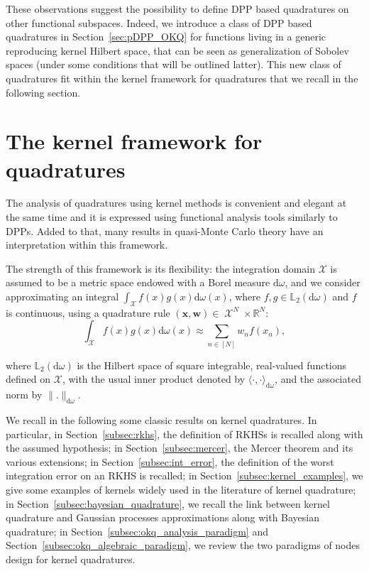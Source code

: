 \documentclass[twoside,11pt]{book}
\numberwithin{theorem}{chapter}
\numberwithin{definition}{chapter}
\numberwithin{proposition}{chapter}
\numberwithin{corollary}{chapter}
\numberwithin{example}{chapter}
\numberwithin{lemma}{chapter}
\DeclareMathOperator{\X}{\mathcal{X}}
\begin{document}
These observations suggest the possibility to define DPP based quadratures on other functional subspaces. Indeed, we introduce a class of DPP based quadratures in Section~\ref{sec:pDPP_OKQ} for functions living in a generic reproducing kernel Hilbert space, that can be seen as generalization of Sobolev spaces (under some conditions that will be outlined latter).
This new class of quadratures fit within the kernel framework for quadratures that we recall in the following section.

\section{The kernel framework for quadratures}


The analysis of quadratures using kernel methods is convenient and elegant at the same time and it is expressed using functional analysis tools similarly to DPPs. Added to that, many results in quasi-Monte Carlo theory have an interpretation within this framework. 

The strength of this framework is its flexibility: the integration domain $\mathcal{X}$ is assumed to be a metric space endowed with a Borel measure $\mathrm{d}\omega$, and we consider approximating an integral $\displaystyle \int_{\X} f(x)g(x)\mathrm{d}\omega(x)$, where $f,g \in \mathbb{L}_{2}(\mathrm{d}\omega)$ and $f$  is continuous, using a quadrature rule $(\bm{x}, \bm{w}) \in \X^{N} \times \mathbb{R}^{N}$:
\begin{equation}\label{eq:int_error}
\int_{\X} f(x)g(x)\mathrm{d}\omega(x) \approx \sum\limits_{n \in [N]} w_{n} f(x_{n}),
\end{equation}

where $\mathbb{L}_{2}(\mathrm{d}\omega)$ is the Hilbert space of square integrable, real-valued functions defined on $\mathcal{X}$, with the usual inner product denoted by $\langle \cdot, \cdot \rangle_{\mathrm{d}\omega}$, and the associated norm by $\|.\|_{\mathrm{d}\omega}$.


We recall in the following some classic results on kernel quadratures. In particular, in Section~\ref{subsec:rkhs},  the definition of RKHSs is recalled along with the assumed hypothesis; in Section~\ref{subsec:mercer}, the Mercer theorem and its various extensions; in Section~\ref{subsec:int_error}, the definition of the worst integration error on an RKHS is recalled; in Section~\ref{subsec:kernel_examples}, we give some examples of kernels widely used in the literature of kernel quadrature; in Section~\ref{subsec:bayesian_quadrature}, we recall the link between kernel quadrature and Gaussian processes approximations along with Bayesian quadrature; in Section~\ref{subsec:okq_analysis_paradigm} and Section~\ref{subsec:okq_algebraic_paradigm}, we review the two paradigms of nodes design for kernel quadratures.
\end{document}
